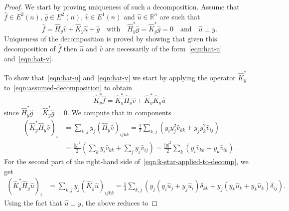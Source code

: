 \documentclass[10pt,a4paper]{amsart}
\newcommand{\abs}[1]{\lvert #1 \rvert}
\begin{document}
\begin{proof}
We start by proving uniqueness of such a decomposition. Assume that $\widehat{f} \in E^2(n)$, $ \widehat g \in E^2(n)$, $\widehat v \in E^1(n)$ and $\widehat u \in \mathbb{R}^n$ are such that
\begin{equation}
\label{eqn:assumed-decomposition}
\widehat f
=
\widehat{H}_y\widehat v
+
\widehat{K}_y\widehat u
+
\widehat g
\quad\text{with}\quad
\widehat{H}^*_y\widehat g
=
\widehat{K}^*_y\widehat g
=
0
\quad\text{and}\quad
\widehat u \perp y.
\end{equation}
Uniqueness of the decomposition is proved by showing that given this decomposition of $\widehat f$ then $\widehat u$ and $\widehat v$ are necessarily of the form~\eqref{eqn:hat-u} and~\eqref{eqn:hat-v}.

To show that~\eqref{eqn:hat-u} and~\eqref{eqn:hat-v} we start by applying the operator $\widehat{K}^*_y$ to~\eqref{eqn:assumed-decomposition} to obtain
\begin{equation}
\label{eqn:k-star-applied-to-decomp}
\widehat{K}^*_y\widehat f
=
\widehat{K}^*_y\widehat{H}_y\widehat v
+
\widehat{K}^*_y\widehat{K}_y\widehat u
\end{equation}
since $\widehat{H}^*_y\widehat g = \widehat{K}^*_y\widehat g = 0$. We compute that in components
\begin{equation}
\label{eqn:k-star-f-decomp-part-1}
\begin{split}
(\widehat{K}^*_y\widehat{H}_y\widehat v)_i
&=
\sum_{k,j}
y_j(\widehat{H}_y\widehat v)_{ijkk}=
\frac{1}{2}
\sum_{k,j}
\left(
y_iy_j^2\widehat v_{kk}
+
y_jy_k^2\widehat v_{ij}
\right)
\\
&=
\frac{\abs{y}^2}{2}
\left(
\sum_{k}
y_i\widehat v_{kk}
+
\sum_{j}
y_j\widehat v_{ij}
\right)=
\frac{\abs{y}^2}{2}
\sum_{k}
\left(
y_i\widehat v_{kk}
+
y_k\widehat v_{ik}
\right).
\end{split}
\end{equation}
For the second part of the right-hand side of~\eqref{eqn:k-star-applied-to-decomp}, we get
\begin{equation}
\begin{split}
(\widehat{K}^*_y\widehat{H}_y\widehat u)_i
&=
\sum_{k,j}
y_j(\widehat{K}_y\widehat u)_{ijkk}=
\frac{1}{4}
\sum_{k,j}
\left(
y_j(y_i\widehat u_j + y_j\widehat u_i)\delta_{kk}
+
y_j(y_k\widehat u_k+y_k\widehat u_k)\delta_{ij}
\right).
\end{split}
\end{equation}
Using the fact that $\widehat u \perp y$, the above reduces to

\end{proof}
\end{document}
